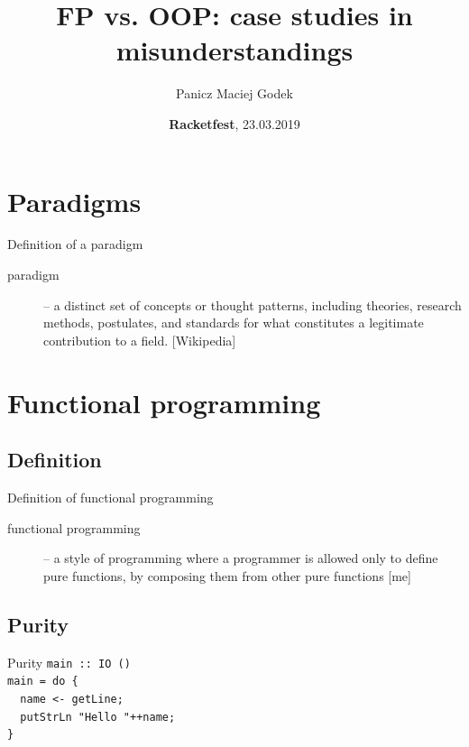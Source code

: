 \documentclass{beamer}
\title{\textbf{FP vs. OOP: case studies in misunderstandings}}
\author{Panicz Maciej Godek}
\institute{
  \tiny{\href{mailto:godek.maciek@gmail.com}{\textbf{godek.maciek@gmail.com}}}
}
\date{\textbf{Racketfest}, 23.03.2019}
\begin{document}
\begin{frame}
  \titlepage
\end{frame}

\section{Paradigms}

\begin{frame}{Definition of a paradigm}
  \begin{description}
  \item [paradigm] -- a distinct set of concepts or thought
    patterns, including theories, research methods, postulates,
    and standards for what constitutes a legitimate contribution
    to a field. [Wikipedia]
  \end{description}
\end{frame}

\section{Functional programming}

\subsection{Definition}

\begin{frame}{Definition of functional programming}
  \begin{description}
  \item [functional programming] -- a style of programming
    where a programmer is allowed only to define pure functions,
    by composing them from other pure functions [me]
  \end{description}
\end{frame}

%

%

%

\subsection{Purity}

\begin{frame}{Purity}
\texttt{main :: IO () \\
main = do \{ \\ 
\ \ name <- getLine; \\ 
\ \ putStrLn "Hello "++name; \\
\} \\
  \
}
\end{frame}
\end{document}
